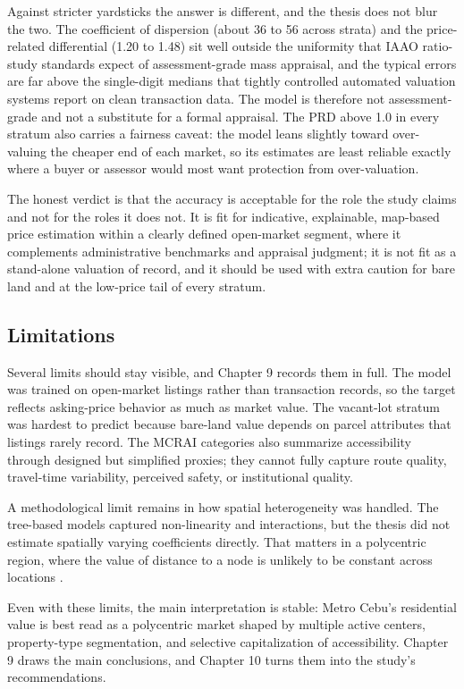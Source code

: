 Against stricter yardsticks the answer is different, and the thesis does not blur the two. The coefficient of dispersion (about 36 to 56 across strata) and the price-related differential (1.20 to 1.48) sit well outside the uniformity that IAAO ratio-study standards expect of assessment-grade mass appraisal, and the typical errors are far above the single-digit medians that tightly controlled automated valuation systems report on clean transaction data. The model is therefore not assessment-grade and not a substitute for a formal appraisal. The PRD above 1.0 in every stratum also carries a fairness caveat: the model leans slightly toward over-valuing the cheaper end of each market, so its estimates are least reliable exactly where a buyer or assessor would most want protection from over-valuation.

The honest verdict is that the accuracy is acceptable for the role the study claims and not for the roles it does not. It is fit for indicative, explainable, map-based price estimation within a clearly defined open-market segment, where it complements administrative benchmarks and appraisal judgment; it is not fit as a stand-alone valuation of record, and it should be used with extra caution for bare land and at the low-price tail of every stratum.

\subsection{Limitations}\label{limitations-ch8}

Several limits should stay visible, and Chapter 9 records them in full. The model was trained on open-market listings rather than transaction records, so the target reflects asking-price behavior as much as market value. The vacant-lot stratum was hardest to predict because bare-land value depends on parcel attributes that listings rarely record. The MCRAI categories also summarize accessibility through designed but simplified proxies; they cannot fully capture route quality, travel-time variability, perceived safety, or institutional quality.

A methodological limit remains in how spatial heterogeneity was handled. The tree-based models captured non-linearity and interactions, but the thesis did not estimate spatially varying coefficients directly. That matters in a polycentric region, where the value of distance to a node is unlikely to be constant across locations \parencite{mcmillen2003employment,heikkila1989cbd}.

Even with these limits, the main interpretation is stable: Metro Cebu's residential value is best read as a polycentric market shaped by multiple active centers, property-type segmentation, and selective capitalization of accessibility. Chapter 9 draws the main conclusions, and Chapter 10 turns them into the study's recommendations.
